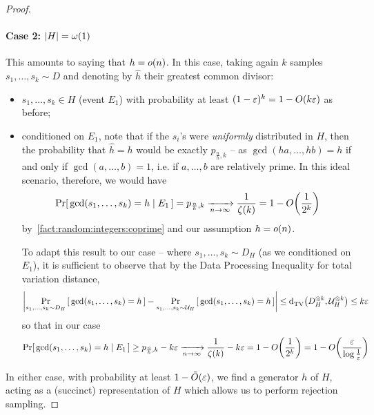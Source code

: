 \begin{proof}
\paragraph*{Case 2: $\left\lvert H \right\rvert=\omega(1)$} This amounts to saying that $h=\littleO{n}$. In this case, taking again $k$ samples $s_1,\dots,s_k\sim D$ and denoting by $\hat{h}$ their greatest common divisor:
\begin{itemize}
  \item $s_1,\dots,s_k\in H$ (event $E_1$) with probability at least $(1-\eps)^k = 1 - \bigO{k\eps}$ as before;
  \item conditioned on $E_1$, note that if the $s_i$'s were \emph{uniformly} distributed in $H$, then the probability that $\hat{h}=h$ would be exactly $p_{\frac{n}{h},k}$ -- as $\gcd(ha,\dots,hb)=h$ if and only if $\gcd(a,\dots,b) =1$, i.e. if $a,\dots,b$ are relatively prime. In this ideal scenario, therefore, we would have
  \[
  \probaCond{ \gcd(s_1,\dots,s_k) = h }{E_1} = p_{\frac{n}{h},k} \xrightarrow[n\to\infty]{} \frac{1}{\zeta(k)} = 1-\bigO{\frac{1}{2^k} }
  \]
  by~\autoref{fact:random:integers:coprime} and our assumption $h=\littleO{n}$.
  
  \noindent To adapt this result to our case -- where $s_1,\dots,s_k\sim D_H$ (as we conditioned on $E_1$), it is sufficient to observe that by the Data Processing Inequality for total variation distance,
  \[
  \left\lvert  \Pr_{s_1,\dots,s_k\sim D_H}\left[\,  \gcd(s_1,\dots,s_k) = h \, \right] - \Pr_{s_1,\dots,s_k\sim \mathcal{U}_H}\left[\,  \gcd(s_1,\dots,s_k) = h \, \right]  \right\rvert \leq {\operatorname{d}_{\textrm{TV}}^{}\!\left({\ensuremath{D}_H^{\otimes k}, \ensuremath{\mathcal{U}}_H^{\otimes k}}\right)} \leq k\varepsilon
  \]
  so that in our case 
  \begin{equation}
  \probaCond{ \gcd(s_1,\dots,s_k) = h }{E_1} \geq p_{\frac{n}{h},k} - k\eps \xrightarrow[n\to\infty]{} \frac{1}{\zeta(k)} - k\eps = 1-\bigO{\frac{1}{2^k}} = 1-\bigO{\frac{\eps}{\log\frac{1}{\eps}}}
  \end{equation}
\end{itemize}

In either case, with probability at least $1-\tildeO{\eps}$, we find a generator $h$ of $H$, acting as a (succinct) representation of $H$ which allows us to perform rejection sampling.
\end{proof}
 
